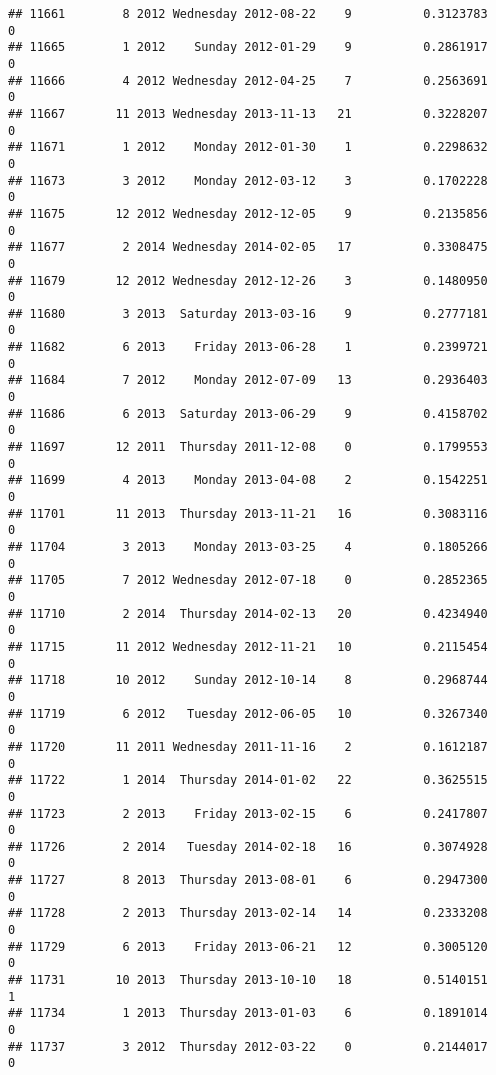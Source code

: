 \documentclass[
]{article}
\begin{document}
\begin{verbatim}
## 11661        8 2012 Wednesday 2012-08-22    9          0.3123783             0
## 11665        1 2012    Sunday 2012-01-29    9          0.2861917             0
## 11666        4 2012 Wednesday 2012-04-25    7          0.2563691             0
## 11667       11 2013 Wednesday 2013-11-13   21          0.3228207             0
## 11671        1 2012    Monday 2012-01-30    1          0.2298632             0
## 11673        3 2012    Monday 2012-03-12    3          0.1702228             0
## 11675       12 2012 Wednesday 2012-12-05    9          0.2135856             0
## 11677        2 2014 Wednesday 2014-02-05   17          0.3308475             0
## 11679       12 2012 Wednesday 2012-12-26    3          0.1480950             0
## 11680        3 2013  Saturday 2013-03-16    9          0.2777181             0
## 11682        6 2013    Friday 2013-06-28    1          0.2399721             0
## 11684        7 2012    Monday 2012-07-09   13          0.2936403             0
## 11686        6 2013  Saturday 2013-06-29    9          0.4158702             0
## 11697       12 2011  Thursday 2011-12-08    0          0.1799553             0
## 11699        4 2013    Monday 2013-04-08    2          0.1542251             0
## 11701       11 2013  Thursday 2013-11-21   16          0.3083116             0
## 11704        3 2013    Monday 2013-03-25    4          0.1805266             0
## 11705        7 2012 Wednesday 2012-07-18    0          0.2852365             0
## 11710        2 2014  Thursday 2014-02-13   20          0.4234940             0
## 11715       11 2012 Wednesday 2012-11-21   10          0.2115454             0
## 11718       10 2012    Sunday 2012-10-14    8          0.2968744             0
## 11719        6 2012   Tuesday 2012-06-05   10          0.3267340             0
## 11720       11 2011 Wednesday 2011-11-16    2          0.1612187             0
## 11722        1 2014  Thursday 2014-01-02   22          0.3625515             0
## 11723        2 2013    Friday 2013-02-15    6          0.2417807             0
## 11726        2 2014   Tuesday 2014-02-18   16          0.3074928             0
## 11727        8 2013  Thursday 2013-08-01    6          0.2947300             0
## 11728        2 2013  Thursday 2013-02-14   14          0.2333208             0
## 11729        6 2013    Friday 2013-06-21   12          0.3005120             0
## 11731       10 2013  Thursday 2013-10-10   18          0.5140151             1
## 11734        1 2013  Thursday 2013-01-03    6          0.1891014             0
## 11737        3 2012  Thursday 2012-03-22    0          0.2144017             0

\end{verbatim}
\end{document}
